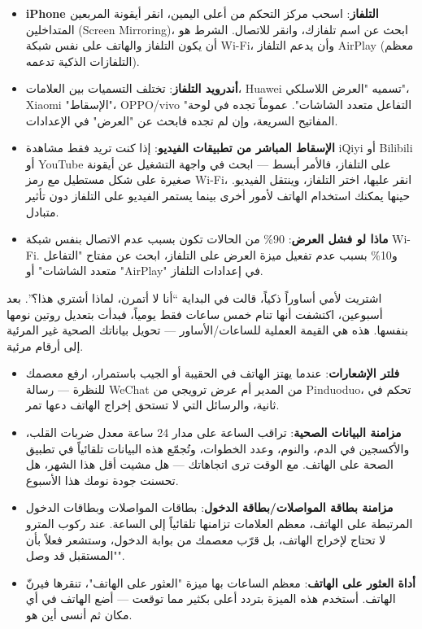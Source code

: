 \begin{itemize}
  \item \textbf{iPhone التلفاز}: اسحب مركز التحكم من أعلى اليمين، انقر أيقونة المربعين المتداخلين (Screen Mirroring)، ابحث عن اسم تلفازك، وانقر للاتصال. الشرط هو أن يكون التلفاز والهاتف على نفس شبكة Wi-Fi، وأن يدعم التلفاز AirPlay (معظم التلفازات الذكية تدعمه).
  \item \textbf{أندرويد التلفاز}: تختلف التسميات بين العلامات، Huawei تسميه "العرض اللاسلكي"، Xiaomi "الإسقاط"، OPPO/vivo "التفاعل متعدد الشاشات". عموماً تجده في لوحة المفاتيح السريعة، وإن لم تجده فابحث عن "العرض" في الإعدادات.
  \item \textbf{الإسقاط المباشر من تطبيقات الفيديو}: إذا كنت تريد فقط مشاهدة iQiyi أو Bilibili أو YouTube على التلفاز، فالأمر أبسط — ابحث في واجهة التشغيل عن أيقونة صغيرة على شكل مستطيل مع رمز Wi-Fi، انقر عليها، اختر التلفاز، وينتقل الفيديو. حينها يمكنك استخدام الهاتف لأمور أخرى بينما يستمر الفيديو على التلفاز دون تأثير متبادل.
  \item \textbf{ماذا لو فشل العرض}: 90\% من الحالات تكون بسبب عدم الاتصال بنفس شبكة Wi-Fi. و10\% بسبب عدم تفعيل ميزة العرض على التلفاز، ابحث عن مفتاح "التفاعل متعدد الشاشات" أو "AirPlay" في إعدادات التلفاز.
\end{itemize}


اشتريت لأمي أساوراً ذكياً، قالت في البداية “أنا لا أتمرن، لماذا أشتري هذا؟”. بعد أسبوعين، اكتشفت أنها تنام خمس ساعات فقط يومياً، فبدأت بتعديل روتين نومها بنفسها. هذه هي القيمة العملية للساعات/الأساور — تحويل بياناتك الصحية غير المرئية إلى أرقام مرئية.

\begin{itemize}
  \item \textbf{فلتر الإشعارات}: عندما يهتز الهاتف في الحقيبة أو الجيب باستمرار، ارفع معصمك للنظرة — رسالة WeChat من المدير أم عرض ترويجي من Pinduoduo، تحكم في ثانية، والرسائل التي لا تستحق إخراج الهاتف دعها تمر.
  \item \textbf{مزامنة البيانات الصحية}: تراقب الساعة على مدار 24 ساعة معدل ضربات القلب، والأكسجين في الدم، والنوم، وعدد الخطوات، وتُجمّع هذه البيانات تلقائياً في تطبيق الصحة على الهاتف. مع الوقت ترى اتجاهاتك — هل مشيت أقل هذا الشهر، هل تحسنت جودة نومك هذا الأسبوع.
  \item \textbf{مزامنة بطاقة المواصلات/بطاقة الدخول}: بطاقات المواصلات وبطاقات الدخول المرتبطة على الهاتف، معظم العلامات تزامنها تلقائياً إلى الساعة. عند ركوب المترو لا تحتاج لإخراج الهاتف، بل قرّب معصمك من بوابة الدخول، وستشعر فعلاً بأن "المستقبل قد وصل".
  \item \textbf{أداة العثور على الهاتف}: معظم الساعات بها ميزة "العثور على الهاتف"، تنقرها فيرنّ الهاتف. أستخدم هذه الميزة بتردد أعلى بكثير مما توقعت — أضع الهاتف في أي مكان ثم أنسى أين هو.
\end{itemize}

